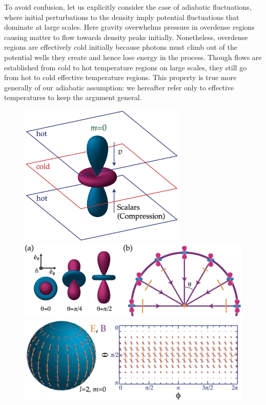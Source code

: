 \documentclass[a4paper,11pt]{article}
\begin{document}
{\noindent} To avoid confusion, let us explicitly consider the case of adiabatic fluctuations, where initial perturbations to the density imply potential fluctuations that dominate at large scales. Here gravity overwhelms pressure in overdense regions causing matter to flow towards density peaks initially. Nonetheless, overdense regions are effectively cold initially because photons must climb out of the potential wells they create and hence lose energy in the process. Though flows are established from cold to hot temperature regions on large scales, they still go from hot to cold effective temperature regions. This property is true more generally of our adiabatic assumption: we hereafter refer only to effective temperatures to keep the argument general.

\begin{figure}[t!]
    \centering
    \vspace{-1cm}
    \includegraphics[width=8cm]{figures/ScalarQuadrupole.png}\\
    \includegraphics[width=15cm]{figures/QuadrupolarAnisotropies.png}\\
    \includegraphics[width=15cm]{figures/ScalarPattern.png}

\end{figure}
\end{document}
